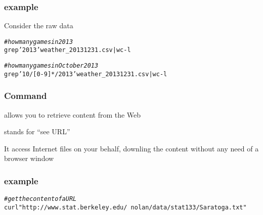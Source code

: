 \documentclass[12pt]{beamer}\usepackage[]{graphicx}\usepackage[]{color}
\makeatletter
\newcommand{\hlstr}[1]{\textcolor[rgb]{0.192,0.494,0.8}{#1}}%
\newcommand{\hlcom}[1]{\textcolor[rgb]{0.678,0.584,0.686}{\textit{#1}}}%
\newenvironment{kframe}{%
 \def\at@end@of@kframe{}%
 \ifinner\ifhmode%
  \def\at@end@of@kframe{\end{minipage}}%
  \begin{minipage}{\columnwidth}%
 \fi\fi%
 \def\FrameCommand##1{\hskip\@totalleftmargin \hskip-\fboxsep
 \colorbox{shadecolor}{##1}\hskip-\fboxsep
     \hskip-\linewidth \hskip-\@totalleftmargin \hskip\columnwidth}%
 \MakeFramed {\advance\hsize-\width
   \@totalleftmargin\z@ \linewidth\hsize
   \@setminipage}}%
 {\par\unskip\endMakeFramed%
 \at@end@of@kframe}
\newenvironment{knitrout}{}{} %
\makeatother
\begin{document}

\begin{frame}[fragile]
\frametitle{ example}

Consider the raw data 
\begin{knitrout}\footnotesize
{}\color{fgcolor}\begin{kframe}
\begin{alltt}
\hlcom{# how many games in 2013}
grep \hlstr{'2013'} weather_20131231.csv | wc -l

\hlcom{# how many games in October 2013}
grep \hlstr{'10/[0-9]*/2013'} weather_20131231.csv | wc -l
\end{alltt}
\end{kframe}
\end{knitrout}

\end{frame}


\begin{frame}
\begin{center}
\Huge{}
\end{center}
\end{frame}


\begin{frame}
\frametitle{Command }

\bbi
  \item {\hilit {}} allows you to retrieve content from the Web
  \item {} stands for ``see URL''
  \item It access Internet files on your behalf, downling the content without any need of a browser window
\ei

\end{frame}


\begin{frame}[fragile]
\frametitle{ example}

\begin{knitrout}\scriptsize
{}\color{fgcolor}\begin{kframe}
\begin{alltt}
\hlcom{# get the content of a URL}
curl \hlstr{"http://www.stat.berkeley.edu/~nolan/data/stat133/Saratoga.txt"}
\end{alltt}
\end{kframe}
\end{knitrout}

\end{frame}
\end{document}
